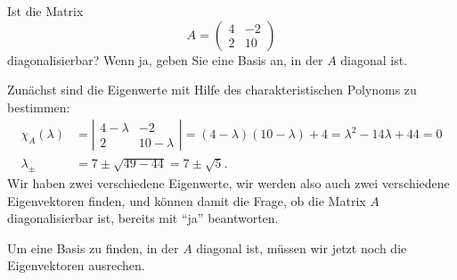 Ist die Matrix
\[
A=\begin{pmatrix}
4&-2\\
2&10
\end{pmatrix}
\]
diagonalisierbar? Wenn ja, geben Sie eine Basis an, in der $A$ diagonal
ist.


\begin{loesung}
Zunächst sind die Eigenwerte mit Hilfe des charakteristischen Polynoms
zu bestimmen:
\begin{align*}
\chi_A(\lambda)
&=
\left|
\begin{matrix}
4-\lambda&-2\\
2&10-\lambda
\end{matrix}
\right|
=
(4-\lambda)(10-\lambda)+4
=
\lambda^2-14\lambda+44
=0
\\
\lambda_{\pm}
&=
7\pm\sqrt{49-44}=7\pm\sqrt{5}.
\end{align*}
Wir haben zwei verschiedene Eigenwerte, wir werden also auch zwei
verschiedene Eigenvektoren finden, und können damit die Frage, ob 
die Matrix $A$ diagonalisierbar ist, bereits mit ``ja'' beantworten.

Um eine Basis zu finden, in der $A$ diagonal ist, müssen wir jetzt
noch die Eigenvektoren ausrechen.


\end{loesung}
